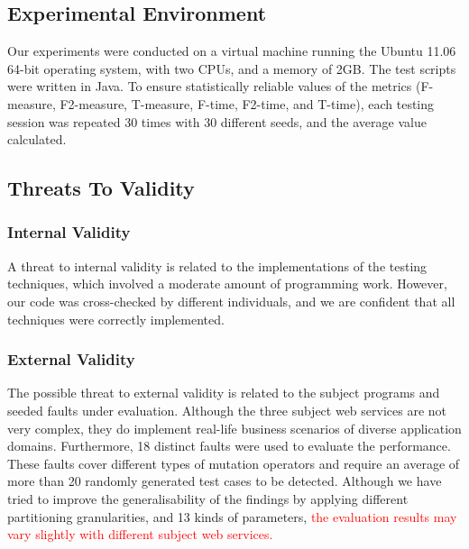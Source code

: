 \documentclass[10pt,journal,compsoc]{IEEEtran}
\begin{document}
\subsection{Experimental Environment}
\label{sec:environment}

Our experiments were conducted on a virtual machine running the Ubuntu 11.06 64-bit operating system, with two CPUs, and a memory of 2GB.
The test scripts were written in Java.
To ensure statistically reliable values \cite{arcuri2011practical} of the metrics (F-measure, F2-measure, T-measure, F-time, F2-time, and T-time), each testing session was repeated 30 times with 30 different seeds, and the average value calculated.

\subsection{Threats To Validity}
\label{sec:threats}

\subsubsection{Internal Validity}
\label{sec:internalthreats}

A threat to internal validity is related to the implementations of the testing techniques, which involved a moderate amount of programming work.
However, our code was cross-checked by different individuals, and we are confident that all techniques were correctly implemented.

\subsubsection{External Validity}
\label{sec:externalthreats}

The possible threat to external validity is related to the subject programs and seeded faults under evaluation.
Although the three subject web services are not very complex, they do implement real-life business scenarios of diverse application domains.
Furthermore, 18 distinct faults were used to evaluate the performance. These faults cover different types of mutation operators and require an average of more than 20 randomly generated test cases to be detected. Although we have tried to improve the generalisability of the findings by applying different partitioning granularities, and 13 kinds of parameters, \textcolor{red}{the evaluation results may vary slightly with different subject web services.}
\end{document}
